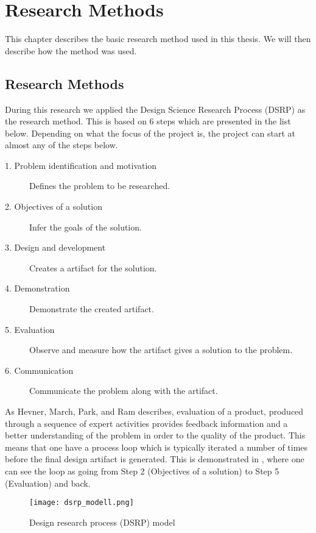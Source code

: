 
\chapter{Research Methods} %
\label{cha:research_questions_and_method}
This chapter describes the basic research method used in this 
thesis. We will then describe how the method was used.
\section{Research Methods} %
\label{sec:research_method}

During this research we applied the Design Science Research Process (DSRP) as the research method. 
This is based on 6 steps which are presented in the list
below. Depending on what the focus of the project is, the project can start at
almost any of the steps below.\cite{peffers2006design}

\begin{description}
	\item [1. Problem identification and motivation] Defines the problem to be
	researched. 
	\item [2. Objectives of a solution] Infer the goals of the solution.
	\item [3. Design and development] Creates a artifact for the solution.
	\item [4. Demonstration] Demonstrate the created artifact.
	\item [5. Evaluation] Observe and measure how the artifact gives a solution 
	to the problem.
	\item [6. Communication] Communicate the problem along with the artifact.
\end{description}

As Hevner, March, Park, and Ram\cite{von2004design} describes, 
evaluation of a product, produced through a sequence of expert activities 
provides feedback information and a better understanding of the problem in 
order to the quality of the product. This means that one have a process loop
which is typically iterated a number of times before the final design artifact
is generated. This is demonstrated in , where one can see the
loop as going from Step 2 (Objectives of a solution) to Step 5 (Evaluation) and
back.

\begin{figure}[!htbp]
	\texttt{[image: dsrp\_modell.png]}
	\caption[Design science research process (DSRP) model]{Design research process (DSRP)
	model\cite{peffers2006design}}
	\label{fig:DSRP}
\end{figure}



